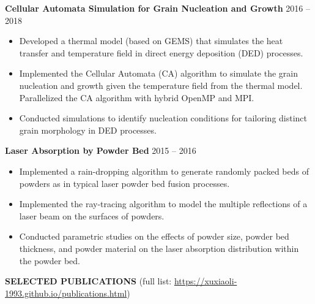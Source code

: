 \documentclass[11pt, letterpaper]{article}
\begin{document}
\vspace{3pt}

\textbf{Cellular Automata Simulation for Grain Nucleation and Growth} \hfill 2016 -- 2018
\begin{itemize}[leftmargin=*, labelsep=5mm]
   \item Developed a thermal model (based on GEMS) that simulates the heat transfer and
      temperature field in direct energy deposition (DED) processes.
   \item Implemented the Cellular Automata (CA) algorithm to simulate the grain nucleation and
      growth given the temperature field from the thermal model. Parallelized the CA algorithm with
      hybrid OpenMP and MPI.
   \item Conducted simulations to identify nucleation conditions for tailoring distinct
      grain morphology in DED processes.
\end{itemize}

\vspace{3pt}

\textbf{Laser Absorption by Powder Bed} \hfill 2015 -- 2016
\begin{itemize}[leftmargin=*, labelsep=5mm]
   \item Implemented a rain-dropping algorithm to generate randomly packed beds of powders as in
      typical laser powder bed fusion processes.
   \item Implemented the ray-tracing algorithm to model the multiple reflections of a laser beam on
      the surfaces of powders.
   \item Conducted parametric studies on the effects of powder size, powder bed thickness, and powder
      material on the laser absorption distribution within the powder bed.
\end{itemize}

\vspace{9pt}

\textbf{SELECTED PUBLICATIONS} \hfill (full list:  
\href{https://xuxiaoli-1993.github.io/publications.html}
{https://xuxiaoli-1993.github.io/publications.html})

\fullrule
\end{document}
